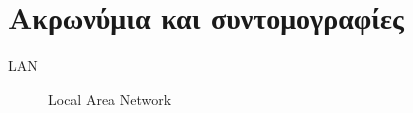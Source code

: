 \section{Ακρωνύμια και συντομογραφίες}

\begin{description}
  \item[LAN] Local Area Network
\end{description}
